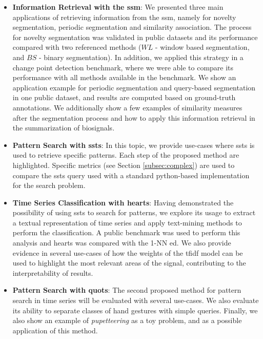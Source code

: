 \begin{itemize}
\item \textbf{Information Retrieval with the \gls{ssm}}:
We presented three main applications of retrieving information from the \gls{ssm}, namely for novelty segmentation, periodic segmentation and similarity association. The process for novelty segmentation was validated in public datasets and its performance compared with two referenced methods ($WL$ - window based segmentation, and $BS$ - binary segmentation). In addition, we applied this strategy in a change point detection benchmark, where we were able to compare its performance with all methods available in the benchmark. We show an application example for periodic segmentation and query-based segmentation in one public dataset, and results are computed based on ground-truth annotations. We additionally show a few examples of similarity measures after the segmentation process and how to apply this information retrieval in the summarization of biosignals.

\item \textbf{Pattern Search with \gls{ssts}}:
In this topic, we provide use-cases where \gls{ssts} is used to retrieve specific patterns. Each step of the proposed method are highlighted. Specific metrics (see Section \ref{subsec:complex}) are used to compare the \gls{ssts} query used with a standard python-based implementation for the search problem.

\item \textbf{Time Series Classification with \gls{hearts}}:
Having demonstrated the possibility of using \gls{ssts} to search for patterns, we explore its usage to extract a textual representation of time series and apply text-mining methods to perform the classification. A public benchmark was used to perform this analysis and \gls{hearts} was compared with the 1-NN \gls{ed}. We also provide evidence in several use-cases of how the weights of the \gls{tfidf} model can be used to highlight the most relevant areas of the signal, contributing to the interpretability of results.

\item \textbf{Pattern Search with \gls{quots}}:
The second proposed method for pattern search in time series will be evaluated with several use-cases. We also evaluate its ability to separate classes of hand gestures with simple queries. Finally, we also show an example of \textit{pupetteering} as a toy problem, and as a possible application of this method. 
\end{itemize}

